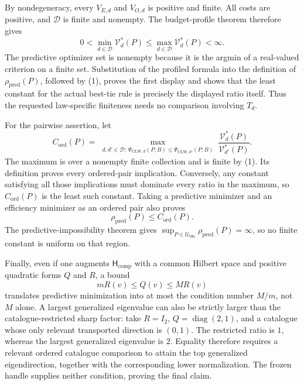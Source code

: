 By nondegeneracy, every \(V_{E,d}\) and \(V_{O,d}\) is positive and finite.  All costs are positive, and \(\mathcal D\) is finite and nonempty.  The budget-profile theorem therefore gives
\[
 0<\min_{d\in\mathcal D}\mathcal V_d^*(P)
 \le\max_{d\in\mathcal D}\mathcal V_d^*(P)<\infty. \tag{1}
\]
The predictive optimizer set is nonempty because it is the argmin of a real-valued criterion on a finite set.  Substitution of the profiled formula into the definition of \(\rho_{\mathrm{pred}}(P)\), followed by (1), proves the first display and shows that the least constant for the actual best-tie rule is precisely the displayed ratio itself.  Thus the requested law-specific finiteness needs no comparison involving \(T_d\).

For the pairwise assertion, let
\[
 C_{\mathrm{ord}}(P)=
 \max_{\substack{d,d'\in\mathcal D:\,
 \Psi_{\mathrm{CLW},d}(P;B)\le\Psi_{\mathrm{CLW},d'}(P;B)}}
 \frac{\mathcal V_d^*(P)}{\mathcal V_{d'}^*(P)}.
\]
The maximum is over a nonempty finite collection and is finite by (1).  Its definition proves every ordered-pair implication.  Conversely, any constant satisfying all those implications must dominate every ratio in the maximum, so \(C_{\mathrm{ord}}(P)\) is the least such constant.  Taking a predictive minimizer and an efficiency minimizer as an ordered pair also proves
\[
 \rho_{\mathrm{pred}}(P)\le C_{\mathrm{ord}}(P).
\]
The predictive-impossibility theorem gives
\(\sup_{P\in\mathcal U_{\mathrm{bin}}}\rho_{\mathrm{pred}}(P)=\infty\), so no finite constant is uniform on that region.

Finally, even if one augments \(\mathsf H_{\mathrm{comp}}\) with a common Hilbert space and positive quadratic forms \(Q\) and \(R\), a bound
\[
 mR(v)\le Q(v)\le MR(v)
\]
translates predictive minimization into at most the condition number \(M/m\), not \(M\) alone.  A largest generalized eigenvalue can also be strictly larger than the catalogue-restricted sharp factor: take \(R=I_2\), \(Q=\operatorname{diag}(2,1)\), and a catalogue whose only relevant transported direction is \((0,1)\).  The restricted ratio is \(1\), whereas the largest generalized eigenvalue is \(2\).  Equality therefore requires a relevant ordered catalogue comparison to attain the top generalized eigendirection, together with the corresponding lower normalization.  The frozen handle supplies neither condition, proving the final claim.